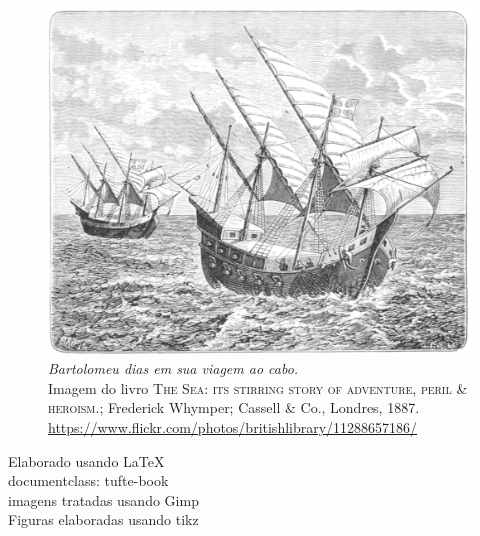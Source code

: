 \documentclass[justified,a4paper,symmetric,nobib,notoc]{tufte-book}
\author{Clebson Abati Graeff}
\title[Notas de aula]{%
  Notas de aula: Física 1 \par \vfill
  \hfill\usebox{\titleimage}}
\begin{document}



\mainmatter












\printbibliography

\cleardoublepage
\thispagestyle{empty}
\begin{figure}
\centering
\includegraphics{Fig/Caravelas.png}
{\emph{Bartolomeu dias em sua viagem ao cabo.} \\ Imagem do livro \textsc{The Sea: its stirring story of adventure, peril \& heroism.}; Frederick Whymper; Cassell \& Co., Londres, 1887. \url{https://www.flickr.com/photos/britishlibrary/11288657186/}}
\end{figure}
\vfill
\begin{fullwidth}
\begin{center}\sc
Elaborado usando \LaTeX \\
documentclass: tufte-book \\
imagens tratadas usando Gimp \\
Figuras elaboradas usando tikz
\end{center}
\end{fullwidth}
\end{document}
